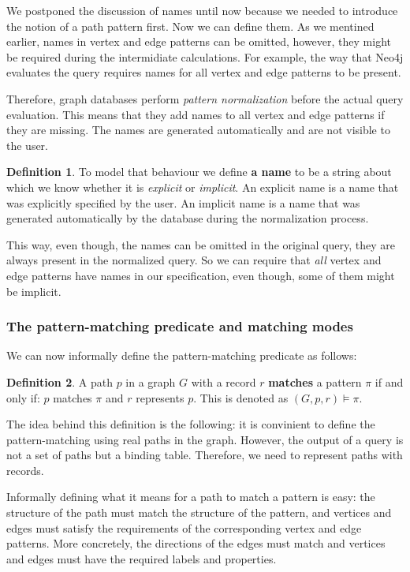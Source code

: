 \documentclass[14pt]{constructor-thesis}
\theoremstyle{definition}
\newtheorem{definition}{Definition}
\begin{document}
We postponed the discussion of names until now because we needed to introduce the notion of a path pattern first. Now we can define them. As we mentined earlier, names in vertex and edge patterns can be omitted, however, they might be required during the intermidiate calculations. For example, the way that Neo4j evaluates the query requires names for all vertex and edge patterns to be present. 

Therefore, graph databases perform \textit{pattern normalization} before the actual query evaluation. This means that they add names to all vertex and edge patterns if they are missing. The names are generated automatically and are not visible to the user.

\begin{definition}
  To model that behaviour we define \textbf{a name} to be a string about which we know whether it is \textit{explicit} or \textit{implicit}. An explicit name is a name that was explicitly specified by the user. An implicit name is a name that was generated automatically by the database during the normalization process.
\end{definition}

This way, even though, the names can be omitted in the original query, they are always present in the normalized query. So we can require that \textit{all} vertex and edge patterns have names in our specification, even though, some of them might be implicit.

\subsubsection{The pattern-matching predicate and matching modes}

We can now informally define the pattern-matching predicate as follows:

\begin{definition}
   A path $p$ in a graph $G$ with a record $r$ \textbf{matches} a pattern $\pi$ if and only if: $p$ matches $\pi$ and $r$ represents $p$. This is denoted as $(G, p, r) \models \pi$.
\end{definition}

The idea behind this definition is the following: it is convinient to define the pattern-matching using real paths in the graph. However, the output of a query is not a set of paths but a binding table. Therefore, we need to represent paths with records.

Informally defining what it means for a path to match a pattern is easy: the structure of the path must match the structure of the pattern, and vertices and edges must satisfy the requirements of the corresponding vertex and edge patterns. More concretely, the directions of the edges must match and vertices and edges must have the required labels and properties.
\end{document}
